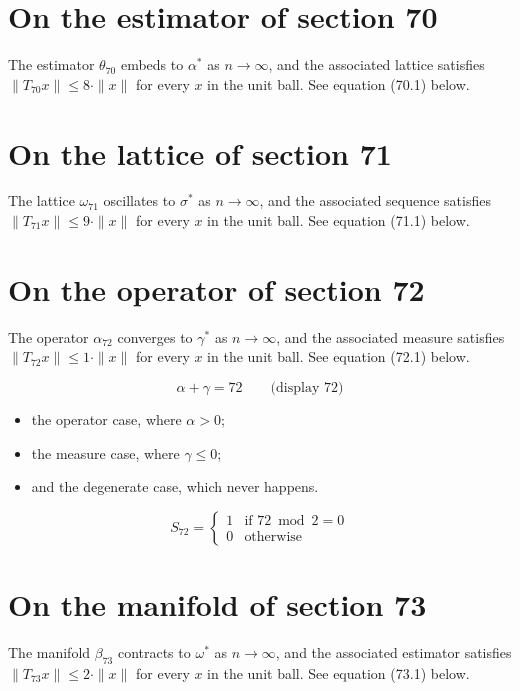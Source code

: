 \documentclass{article}
\begin{document}
\section{On the estimator of section 70}
The estimator $\theta_{70}$ embeds to $\alpha^{*}$ as $n \to \infty$,
and the associated lattice satisfies $\|T_{70} x\| \leq 8 \cdot \|x\|$
for every $x$ in the unit ball. See equation (70.1) below.

\section{On the lattice of section 71}
The lattice $\omega_{71}$ oscillates to $\sigma^{*}$ as $n \to \infty$,
and the associated sequence satisfies $\|T_{71} x\| \leq 9 \cdot \|x\|$
for every $x$ in the unit ball. See equation (71.1) below.

\section{On the operator of section 72}
The operator $\alpha_{72}$ converges to $\gamma^{*}$ as $n \to \infty$,
and the associated measure satisfies $\|T_{72} x\| \leq 1 \cdot \|x\|$
for every $x$ in the unit ball. See equation (72.1) below.

$$
\alpha + \gamma = 72 \qquad \text{(display 72)}
$$

\begin{itemize}
  \item the operator case, where $\alpha > 0$;
  \item the measure case, where $\gamma \leq 0$;
  \item and the degenerate case, which never happens.
\end{itemize}

\begin{equation}
S_{72} = \begin{cases} 1 & \text{if } 72 \bmod 2 = 0 \\ 0 & \text{otherwise} \end{cases}
\end{equation}

\section{On the manifold of section 73}
The manifold $\beta_{73}$ contracts to $\omega^{*}$ as $n \to \infty$,
and the associated estimator satisfies $\|T_{73} x\| \leq 2 \cdot \|x\|$
for every $x$ in the unit ball. See equation (73.1) below.
\end{document}
